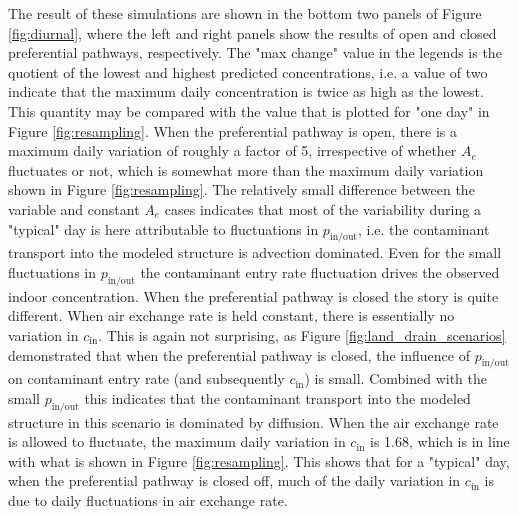 \documentclass[preprint,12pt]{elsarticle}
\begin{document}
The result of these simulations are shown in the bottom two panels of Figure \ref{fig:diurnal}, where the left and right panels show the results of open and closed preferential pathways, respectively.
The "max change" value in the legends is the quotient of the lowest and highest predicted concentrations, i.e. a value of two indicate that the maximum daily concentration is twice as high as the lowest.
This quantity may be compared with the value that is plotted for "one day" in Figure \ref{fig:resampling}.
When the preferential pathway is open, there is a maximum daily variation of roughly a factor of 5, irrespective of whether $A_e$ fluctuates or not, which is somewhat more than the maximum daily variation shown in Figure \ref{fig:resampling}.
The relatively small difference between the variable and constant $A_e$ cases indicates that most of the variability during a "typical" day is here attributable to fluctuations in $p_\mathrm{in/out}$, i.e. the contaminant transport into the modeled structure is advection dominated.
Even for the small fluctuations in $p_\mathrm{in/out}$ the contaminant entry rate fluctuation drives the observed indoor concentration.
When the preferential pathway is closed the story is quite different.
When air exchange rate is held constant, there is essentially no variation in $c_\mathrm{in}$.
This is again not surprising, as Figure \ref{fig:land_drain_scenarios} demonstrated that when the preferential pathway is closed, the influence of $p_\mathrm{in/out}$ on contaminant entry rate (and subsequently $c_\mathrm{in}$) is small.
Combined with the small $p_\mathrm{in/out}$ this indicates that the contaminant transport into the modeled structure in this scenario is dominated by diffusion.
When the air exchange rate is allowed to fluctuate, the maximum daily variation in $c_\mathrm{in}$ is 1.68, which is in line with what is shown in Figure \ref{fig:resampling}.
This shows that for a "typical" day, when the preferential pathway is closed off, much of the daily variation in $c_\mathrm{in}$ is due to daily fluctuations in air exchange rate.\par
\end{document}
